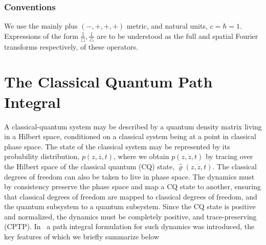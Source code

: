 \documentclass[aps,preprintnumbers,superscriptaddress,longbibliography]{revtex4-1}
\begin{document}
\subsubsection{Conventions}
We use the mainly plus $(-,+,+,+)$ metric, and natural units, $c=\hbar=1$. Expressions of the form $\frac{1}{\Box},\frac{1}{\triangle}$ are to be understood as the full and spatial Fourier transforms respectively, of these operators.

\section{The Classical Quantum Path Integral}
\label{CQPI}

A classical-quantum system may be described by a quantum density matrix living in a Hilbert space, conditioned on a classical system being at a point in classical phase space.  The state of the classical system may be represented by its probability distribution, $p(z,\dot{z,}t)$, where we obtain $p(z,\dot z,t)$ by tracing over the Hilbert space of the classical quantum (CQ) state, $\hat{\varrho}(z,\dot{z},t)$. The classical degrees of freedom can also be taken to live in phase space. The dynamics must by consistency preserve the phase space and map a CQ state to another, ensuring that classical degrees of freedom are mapped to classical degrees of freedom, and the quantum subsystem to a quantum subsystem. Since the CQ state is positive and normalized, the dynamics must be completely positive, and trace-preserving (CPTP).  In~\cite{oppenheim2022path} a path integral formulation for such dynamics was introduced, the key features of which we briefly summarize below
\end{document}
